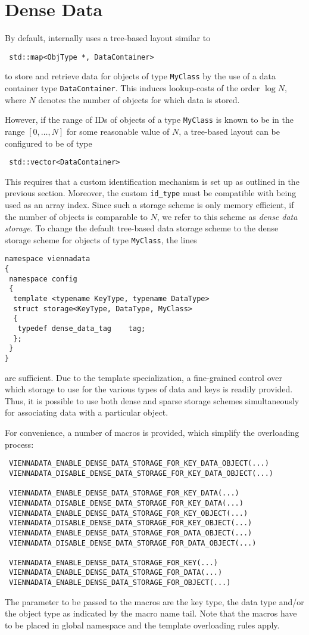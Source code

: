 \section{Dense Data} \label{sec:dense-data}
By default, {\ViennaData} internally uses a tree-based layout similar to
\begin{lstlisting}
 std::map<ObjType *, DataContainer>
\end{lstlisting}
to store and retrieve data for objects of type \lstinline|MyClass| by the use of a data container type \lstinline|DataContainer|.
This induces lookup-costs of the order $\log N$, where $N$ denotes the number of objects for which data is stored.

However, if the range of IDs of objects of a type \lstinline|MyClass| is known to be in the range $[0, \ldots, N]$ for some reasonable value of $N$,
a tree-based layout can be configured to be of type
\begin{lstlisting}
 std::vector<DataContainer>
\end{lstlisting}
This requires that a custom identification mechanism is set up as outlined in the previous section. Moreover, the 
custom \lstinline|id_type| must be compatible with being used as an array index. Since such a storage scheme is only memory efficient,
if the number of objects is comparable to $N$, we refer to this scheme as \emph{dense data storage}.
To change the default tree-based data storage scheme to the dense storage scheme for objects of type \lstinline|MyClass|, the lines
\begin{lstlisting}
namespace viennadata
{
 namespace config
 {
  template <typename KeyType, typename DataType>
  struct storage<KeyType, DataType, MyClass>
  {
   typedef dense_data_tag    tag;
  };
 }
}
\end{lstlisting}
are sufficient. Due to the template specialization, a fine-grained control over which storage to use for the various types of data and keys is readily provided. Thus, it is possible to use both dense and sparse storage schemes simultaneously for associating data with a particular object.

For convenience, a number of macros is provided, which simplify the overloading process:
\begin{lstlisting}
 VIENNADATA_ENABLE_DENSE_DATA_STORAGE_FOR_KEY_DATA_OBJECT(...)
 VIENNADATA_DISABLE_DENSE_DATA_STORAGE_FOR_KEY_DATA_OBJECT(...)

 VIENNADATA_ENABLE_DENSE_DATA_STORAGE_FOR_KEY_DATA(...)
 VIENNADATA_DISABLE_DENSE_DATA_STORAGE_FOR_KEY_DATA(...)
 VIENNADATA_ENABLE_DENSE_DATA_STORAGE_FOR_KEY_OBJECT(...)
 VIENNADATA_DISABLE_DENSE_DATA_STORAGE_FOR_KEY_OBJECT(...)
 VIENNADATA_ENABLE_DENSE_DATA_STORAGE_FOR_DATA_OBJECT(...)
 VIENNADATA_DISABLE_DENSE_DATA_STORAGE_FOR_DATA_OBJECT(...)

 VIENNADATA_ENABLE_DENSE_DATA_STORAGE_FOR_KEY(...)
 VIENNADATA_ENABLE_DENSE_DATA_STORAGE_FOR_DATA(...)
 VIENNADATA_ENABLE_DENSE_DATA_STORAGE_FOR_OBJECT(...)
\end{lstlisting}
The parameter to be passed to the macros are the key type, the data type and/or the object type as indicated by the macro name tail.
Note that the macros have to be placed in global namespace and the template overloading rules apply.

